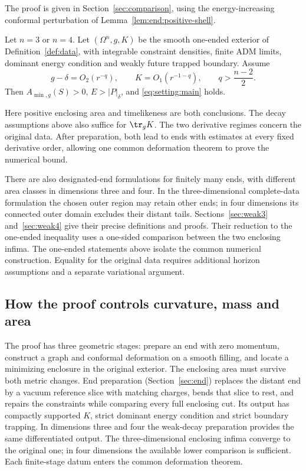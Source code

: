 The proof is given in Section~\ref{sec:comparison}, using the energy-increasing
conformal perturbation of Lemma~\ref{lem:end:positive-shell}.

\begin{theorem}\label{thm:low}
Let $n=3$ or $n=4$. Let $(\Omega^n,g,K)$ be the smooth one-ended
exterior of Definition~\ref{def:data}, with integrable constraint densities, finite
ADM limits, dominant energy condition and weakly future trapped
boundary. Assume
\[
 g-\delta=O_2(r^{-q}),\qquad K=O_1(r^{-1-q}),\qquad q>\frac{n-2}{2}.
\]
Then $A_{\min,g}(S)>0$, $E>|P|_\delta$, and \eqref{eq:setting:main} holds.
\end{theorem}

Here positive enclosing area and timelikeness are both conclusions.
The decay assumptions above also suffice for $\tr_gK$. The two derivative regimes concern
the original data. After preparation, both lead to ends with estimates at every fixed derivative
order, allowing one common deformation theorem to prove the numerical
bound.

There are also designated-end formulations for finitely many ends,
with different area classes in dimensions three and four. In the
three-dimensional complete-data formulation the chosen outer region
may retain other ends; in four dimensions its connected outer domain
excludes their distant tails. Sections~\ref{sec:weak3} and~\ref{sec:weak4} give their
precise definitions and proofs. Their reduction to the one-ended inequality uses a one-sided comparison
between the two enclosing infima. The one-ended statements above isolate the common numerical
construction. Equality for the original data requires additional
horizon assumptions and a separate variational argument.

\subsection{How the proof controls curvature, mass and area}
The proof has three geometric stages: prepare an end with zero momentum,
construct a graph and conformal deformation on a smooth filling, and
locate a minimizing enclosure in the original exterior. The enclosing
area must survive both metric changes. End preparation (Section~\ref{sec:end}) replaces the distant
end by a vacuum reference slice with matching charges, bends that slice
to rest, and repairs the constraints while comparing every full enclosing
cut. Its output has compactly supported $K$, strict dominant energy
condition and strict boundary trapping. In dimensions three and four
the weak-decay preparation provides the same differentiated output.
The three-dimensional enclosing infima converge to the original one;
in four dimensions the available lower comparison is sufficient. Each finite-stage datum enters the common deformation theorem.

